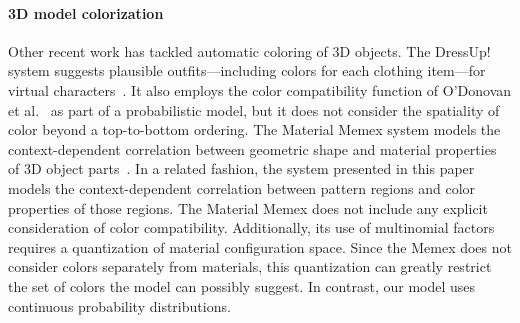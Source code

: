 \paragraph{3D model colorization}
Other recent work has tackled automatic coloring of 3D objects. The DressUp! system suggests plausible outfits---including colors for each clothing item---for virtual characters~\cite{DressUp}. It also employs the color compatibility function of O'Donovan et al.~ as part of a probabilistic model, but it does not consider the spatiality of color beyond a top-to-bottom ordering. The Material Memex system models the context-dependent correlation between geometric shape and material properties of 3D object parts~\cite{MaterialMemex}. In a related fashion, the system presented in this paper models the context-dependent correlation between pattern regions and color properties of those regions. The Material Memex does not include any explicit consideration of color compatibility. Additionally, its use of multinomial factors requires a quantization of material configuration space. Since the Memex does not consider colors separately from materials, this quantization can greatly restrict the set of colors the model can possibly suggest. In contrast, our model uses continuous probability distributions.